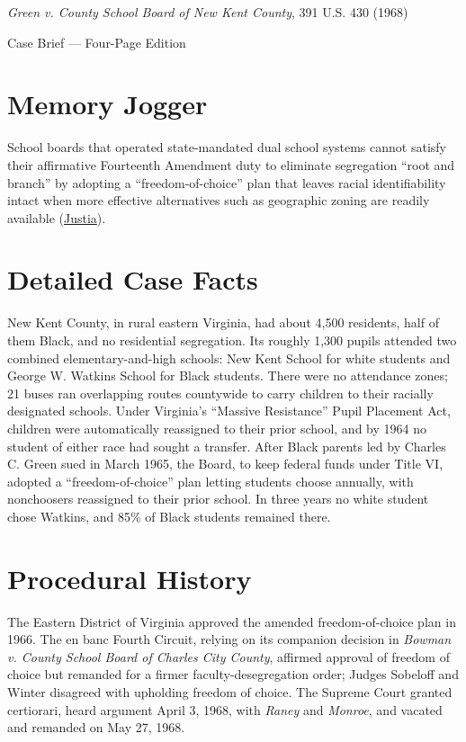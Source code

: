 \documentclass[12pt]{article}
\begin{document}
\begin{center}
{\LARGE \textit{Green v. County School Board of New Kent County}, 391 U.S. 430 (1968)\par}
\vspace{0.8em}
{\large Case Brief --- Four-Page Edition\par}
\end{center}
\vspace{1em}

\section{Memory Jogger}

School boards that operated state-mandated dual school systems cannot satisfy their affirmative Fourteenth Amendment duty to eliminate segregation ``root and branch'' by adopting a ``freedom-of-choice'' plan that leaves racial identifiability intact when more effective alternatives such as geographic zoning are readily available (\href{https://supreme.justia.com/cases/federal/us/391/430/}{Justia}).

\section{Detailed Case Facts}

New Kent County, in rural eastern Virginia, had about 4,500 residents, half of them Black, and no residential segregation. Its roughly 1,300 pupils attended two combined elementary-and-high schools: New Kent School for white students and George W. Watkins School for Black students. There were no attendance zones; 21 buses ran overlapping routes countywide to carry children to their racially designated schools. Under Virginia's ``Massive Resistance'' Pupil Placement Act, children were automatically reassigned to their prior school, and by 1964 no student of either race had sought a transfer. After Black parents led by Charles C. Green sued in March 1965, the Board, to keep federal funds under Title VI, adopted a ``freedom-of-choice'' plan letting students choose annually, with nonchoosers reassigned to their prior school. In three years no white student chose Watkins, and 85\% of Black students remained there.

\section{Procedural History}

The Eastern District of Virginia approved the amended freedom-of-choice plan in 1966. The en banc Fourth Circuit, relying on its companion decision in \textit{Bowman v. County School Board of Charles City County}, affirmed approval of freedom of choice but remanded for a firmer faculty-desegregation order; Judges Sobeloff and Winter disagreed with upholding freedom of choice. The Supreme Court granted certiorari, heard argument April 3, 1968, with \textit{Raney} and \textit{Monroe}, and vacated and remanded on May 27, 1968.
\end{document}
